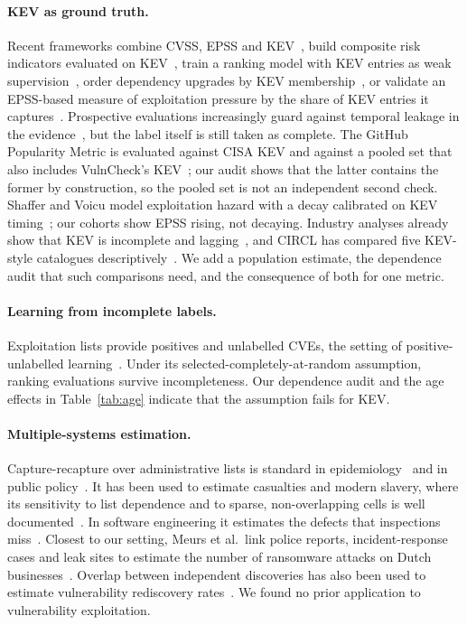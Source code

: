 \paragraph{KEV as ground truth.} Recent frameworks combine CVSS, EPSS and
KEV~\cite{shimizu2026chaining,podder2026cape}, build composite risk indicators
evaluated on KEV~\cite{sherif2026kri}, train a ranking model with KEV entries as
weak supervision~\cite{motamedi2026threatlens}, order dependency upgrades by
KEV membership~\cite{omondi2026kevgraph}, or validate an EPSS-based measure of
exploitation pressure by the share of KEV entries it captures~\cite{almarashi2026entropy}. Prospective evaluations increasingly
guard against temporal leakage in the evidence~\cite{alpay2026graphs}, but the
label itself is still taken as complete. The GitHub Popularity Metric is
evaluated against CISA KEV and against a pooled set that also includes
VulnCheck's KEV~\cite{akhoundali2026gpm}; our audit shows that the latter
contains the former by construction, so the pooled set is not an independent
second check. Shaffer and Voicu model exploitation hazard with a decay
calibrated on KEV timing~\cite{shaffer2026hazard}; our cohorts show EPSS
rising, not decaying. Industry analyses already show that KEV is incomplete and
lagging~\cite{roytman2026kevparadox,garrity2026state,beardsley2025kevology}, and
CIRCL has compared five KEV-style catalogues
descriptively~\cite{circl2026kevcatalogs}. We add a population estimate, the
dependence audit that such comparisons need, and the consequence of both for
one metric.

\paragraph{Learning from incomplete labels.} Exploitation lists provide
positives and unlabelled CVEs, the setting of positive-unlabelled
learning~\cite{elkan2008pu,bekker2020pu}. Under its
selected-completely-at-random assumption, ranking evaluations survive
incompleteness. Our dependence audit and the age effects in
Table~\ref{tab:age} indicate that the assumption fails for KEV.

\paragraph{Multiple-systems estimation.} Capture-recapture over administrative
lists is standard in epidemiology~\cite{iwgdmf1995} and in public
policy~\cite{bird2018mse}. It has been used to estimate casualties and modern
slavery, where its sensitivity to list dependence and to sparse,
non-overlapping cells is well documented~\cite{binette2022mse,chan2021sparse}.
In software engineering it estimates the defects that inspections
miss~\cite{petersson2004inspection}. Closest to our setting, Meurs et al.\ link
police reports, incident-response cases and leak sites to estimate the number
of ransomware attacks on Dutch businesses~\cite{meurs2026ransomware}. Overlap
between independent discoveries has also been used to estimate vulnerability
rediscovery rates~\cite{herr2017rediscovery,ablon2017zeroday}. We found no
prior application to vulnerability exploitation.

